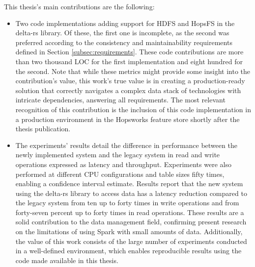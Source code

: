 This thesis's main contributions are the following:
\begin{itemize}
    \item Two code implementations adding support for \gls{HDFS} and \gls{HopsFS} in the delta-rs library. Of these, the first one is incomplete, as the second was preferred according to the consistency and maintainability requirements defined in Section \ref{subsec:requirements}. These code contributions are more than two thousand \gls{LOC} for the first implementation and eight hundred for the second. Note that while these metrics might provide some insight into the contribution's value, this work's true value is in creating a production-ready solution that correctly navigates a complex data stack of technologies with intricate dependencies, answering all requirements. The most relevant recognition of this contribution is the inclusion of this code implementation in a production environment in the Hopsworks feature store shortly after the thesis publication.
    \item The experiments' results detail the difference in performance between the newly implemented system and the legacy system in read and write operations expressed as latency and throughput. Experiments were also performed at different \gls{CPU} configurations and table sizes fifty times, enabling a confidence interval estimate. Results report that the new system using the delta-rs library to access data has a latency reduction compared to the legacy system from ten up to forty times in write operations and from forty-seven percent up to forty times in read operations. These results are a solid contribution to the data management field, confirming present research on the limitations of using Spark with small amounts of data. Additionally, the value of this work consists of the large number of experiments conducted in a well-defined environment, which enables reproducible results using the code made available in this thesis.
\end{itemize}
